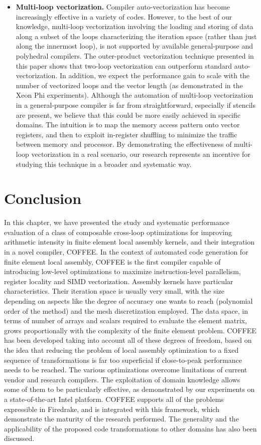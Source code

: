 \begin{itemize}
\item \textbf{Multi-loop vectorization.} Compiler auto-vectorization has become increasingly effective in a variety of codes. However, to the best of our knowledge, multi-loop vectorization involving the loading and storing of data along a subset of the loops characterizing the iteration space (rather than just along the innermost loop), is not supported by available general-purpose and polyhedral compilers. The outer-product vectorization technique presented in this paper shows that two-loop vectorization can outperform standard auto-vectorization. In addition, we expect the performance gain to scale with the number of vectorized loops and the vector length (as demonstrated in  the Xeon Phi experiments). Although the automation of multi-loop vectorization in a general-purpose compiler is far from straightforward, especially if stencils are present, we believe that this could be more easily achieved in specific domains. The intuition is to map the memory access pattern onto vector registers, and then to exploit in-register shuffling to minimize the traffic between memory and processor. By demonstrating the effectiveness of multi-loop vectorization in a real scenario, our research represents an incentive for studying this technique in a broader and systematic way.
\end{itemize}

\section{Conclusion}
\label{sec:coffee-conclusion}
In this chapter, we have presented the study and systematic performance evaluation of a class of composable cross-loop optimizations for improving arithmetic intensity in finite element local assembly kernels, and their integration in a novel compiler, COFFEE. In the context of automated code generation for finite element local assembly, COFFEE is the first compiler capable of introducing low-level optimizations to maximize instruction-level parallelism, register locality and SIMD vectorization. Assembly kernels have particular characteristics. Their iteration space is usually very small, with the size depending on aspects like the degree of accuracy one wants to reach (polynomial order of the method) and the mesh discretization employed. The data space, in terms of number of arrays and scalars required to evaluate the element matrix, grows proportionally with the complexity of the finite element problem. COFFEE has been developed taking into account all of these degrees of freedom, based on the idea that reducing the problem of local assembly optimization to a fixed sequence of transformations is far too superficial if close-to-peak performance needs to be reached. The various optimizations overcome limitations of current vendor and research compilers. The exploitation of domain knowledge allows some of them to be particularly effective, as demonstrated by our experiments on a state-of-the-art Intel platform. COFFEE supports all of the problems expressible in Firedrake, and is integrated with this framework, which demonstrate the maturity of the research performed. The generality and the applicability of the proposed code transformations to other domains has also been discussed.
